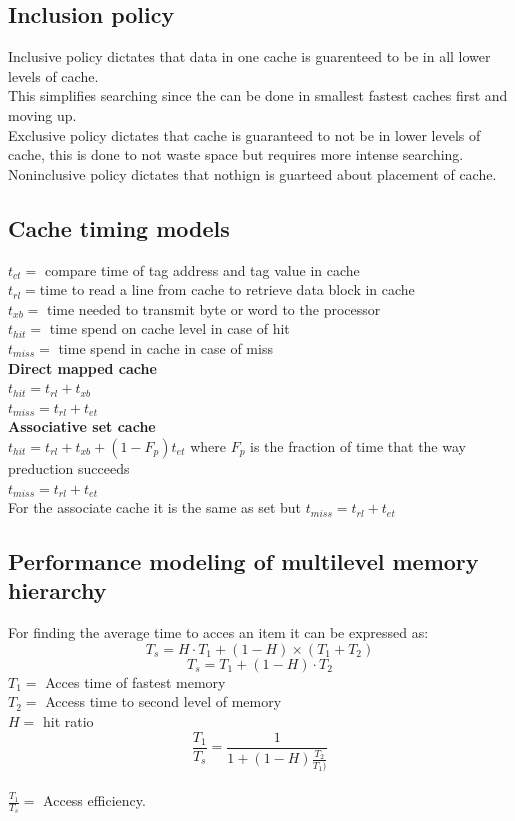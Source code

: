 \documentclass[12pt, a4paper]{article}
\begin{document}
		\subsection{Inclusion policy}
			Inclusive policy dictates that data in one cache is guarenteed to be in all lower levels of cache. \\
			This simplifies searching since the can be done in smallest fastest caches first and moving up.\\
			Exclusive policy dictates that cache is guaranteed to not be in lower levels of cache, this is done to not waste space but requires more intense searching.\\
			Noninclusive policy dictates that nothign is guarteed about placement of cache. 
		\subsection{Cache timing models}
			$t_{ct}=$ compare time of tag address and tag value in cache\\
			$t_{rl}=$time to read a line from cache to retrieve data block in cache\\
			$t_{xb}=$ time needed to transmit byte or word to the processor\\
			$t_{hit}=$ time spend on cache level in case of hit\\
			$t_{miss}=$ time spend in cache in case of miss\\
			\textbf{Direct mapped cache}\\
			$t_{hit}=t_{rl}+t_{xb}$\\
			$t_{miss}=t_{rl}+t_{et}$\\
			\textbf{Associative set cache}\\
			$t_{hit}=t_{rl}+t_{xb}+(1-F_p)t_{et}$ where $F_p$ is the fraction of time that the way preduction succeeds\\
			$t_{miss}=t_{rl}+t_{et}$\\
			For the associate cache it is the same as set but $t_{miss}=t_{rl}+t_{et}$
		\subsection{Performance modeling of multilevel memory hierarchy}
			For finding the average time to acces an item it can be expressed as:
			$$T_s=H\cdot T_1+(1-H)\times (T_1+T_2)$$
			$$T_s=T_1+(1-H)\cdot T_2$$
			$T_1=$ Acces time of fastest memory\\
			$T_2=$ Access time to second level of memory\\
			$H=$ hit ratio\\
			$$\frac{T_1}{T_s}=\frac{1}{1+(1-H)\frac{T_2}{T_1)}}$$\\
			$\frac{T_1}{T_s}=$ Access efficiency.\\
			
\end{document}
